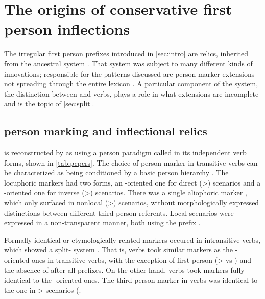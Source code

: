 \section{The origins of conservative first person inflections}
\label{sec:background}
The irregular first person prefixes introduced in \cref{sec:intro} are relics, inherited from the ancestral \PC system .
That system was subject to many different kinds of innovations; responsible for the patterns discussed are person marker extensions not spreading through the entire  lexicon .
A particular component of the system, the distinction between  and  verbs, plays a role in what extensions are incomplete and is the topic of \cref{sec:split}.

\subsection{\PC person marking and inflectional relics}
\label{sec:pc_person}
\PC is reconstructed by \textcite{gildea1998} as using a person paradigm called \setone in its independent verb forms, shown in \cref{tab:pcpers}.
The choice of person marker in transitive verbs can be characterized as being conditioned by a basic person hierarchy .
The locuphoric markers had two forms, an -oriented one for direct (>) scenarios and a -oriented one for inverse (>) scenarios.
There was a single aliophoric marker , which only surfaced in nonlocal (>) scenarios, without morphologically expressed distinctions between different third person referents.
Local scenarios were expressed in a non-transparent manner, both using the  prefix .



Formally identical or etymologically related markers occured in intransitive verbs, which showed a split- system .
That is,  verbs took similar markers as the -oriented ones in transitive verbs, with the exception of first person (>  vs  ) and the absence of  after all  prefixes.
On the other hand,  verbs took markers fully identical to the -oriented ones.
The third person marker in  verbs was identical to the one in > scenarios (.

